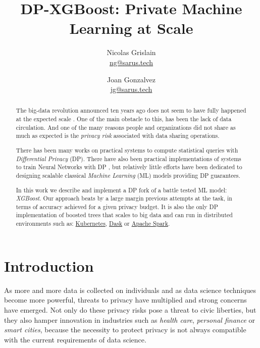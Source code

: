 \documentclass{article}
\theoremstyle{definition}
\begin{document}
\title{DP-XGBoost: Private Machine Learning at Scale}
\author{Nicolas Grislain\\
\url{ng@sarus.tech} \\ 
\and 
Joan Gonzalvez \\
\url{jg@sarus.tech}}
\date{}
\maketitle

\begin{abstract}
The big-data revolution announced ten years ago \cite{manyika2011big}
does not seem to have fully happened at the expected scale \cite{analytics2016age}.
One of the main obstacle to this, has been the lack of data circulation.
And one of the many reasons people and organizations did not share as much as expected
is the \emph{privacy risk} associated with data sharing operations.

There has been many works on practical systems to compute statistical
queries with \emph{Differential Privacy} (DP). There have also been practical implementations of
systems to train Neural Networks with DP \cite{mcmahan2018general, opacus}, but relatively little efforts
have been dedicated to designing scalable classical \emph{Machine Learning} (ML) models providing
DP guarantees.

In this work we describe and implement a DP fork of a battle tested ML model: \emph{XGBoost}.
Our approach beats by a large margin previous attempts at the task, in terms of accuracy achieved for a given privacy budget.
It is also the only DP implementation of boosted trees that scales to big data and can run in
distributed environments such as: \href{https://kubernetes.io/}{Kubernetes}, \href{https://dask.org/}{Dask} or \href{https://spark.apache.org/}{Apache Spark}.
\end{abstract}

\section{Introduction}

As more and more data is collected on individuals and as data science techniques become more powerful,
threats to privacy have multiplied and strong concerns have emerged.
Not only do these privacy risks pose a threat to civic liberties, but they also hamper innovation in industries
such as \emph{health care}, \emph{personal finance} or \emph{smart cities}, because the necessity to protect
privacy is not always compatible with the current requirements of data science.
\end{document}
